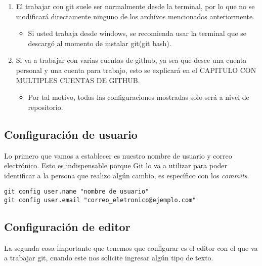 \begin{pucpImportant}
	
	\begin{enumerate}
		\item El trabajar con git suele ser normalmente desde la terminal, por lo que no se modificará directamente ninguno de los archivos mencionados anteriormente.
		\begin{itemize}
			\item Si usted trabaja desde windows, se recomienda usar la terminal que se descargó al momento de instalar git(git bash).
		\end{itemize}
		\item Si va a trabajar con varias cuentas de github, ya sea que desee una cuenta personal y una cuenta para trabajo, esto se explicará en el \textcolor{pucpRojo}	{CAPITULO CON MULTIPLES CUENTAS DE GITHUB}.
		\begin{itemize}
			\item Por tal motivo, todas las configuraciones mostradas solo será a nivel de repositorio.
		\end{itemize}
	\end{enumerate}

\end{pucpImportant}

\subsection{Configuración de usuario}

Lo primero que vamos a establecer es nuestro nombre de usuario y correo electrónico. Esto es indispensable
porque Git lo va a utilizar para poder identificar a la persona que realizo algún cambio, es específico con los \emph{commits}.

\begin{gitCode}
\begin{verbatim}
git config user.name "nombre de usuario"
git config user.email "correo_eletronico@ejemplo.com"
\end{verbatim}
\end{gitCode}

\subsection{Configuración de editor}

La segunda cosa importante que tenemos que configurar es el editor con el que va a trabajar git, cuando este nos solicite ingresar algún tipo de texto.



